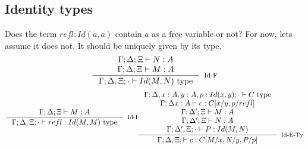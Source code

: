\subsection{Identity types}
Does the term $refl : Id(a,a)$ contain $a$ as a free variable or not? For now, lets assume it does not. It should be uniquely given by its type.
\[
\begin{split}
\inference {\Gamma; \Delta; \Xi \vdash N : A\\
\Gamma;  \Delta; \Xi \vdash M : A\\
}
           {\Gamma; \Delta, \Xi; \cdot \vdash Id(M, N) \text{ type}
           }[Id-F]
\end{split}
\]
\[
\begin{split}
\inference {\Gamma; \Delta; \Xi \vdash M : A\\
}
           {\Gamma; \Delta, \Xi; \cdot \vdash refl : Id(M, M) \text{ type}
           }[Id-I]
\end{split}
\begin{split}
  \inference {\Gamma; \Delta, x : A, y : A, p : Id(x, y); \cdot  \vdash C \text{ type}\\
    \Gamma; \Delta x : A \vdash c : C[x/y, p/refl]\\
    \Gamma; \Delta'; \Xi \vdash M : A\\
    \Gamma; \Delta'; \Xi \vdash N : A\\
    \Gamma; \Delta', \Xi; \cdot \vdash P : Id(M, N)\\
}
           {\Gamma; \Delta, \Xi; \vdash c : C[M/x, N/y, P/p]
           }[Id-E-Ty]
\end{split}
\]\\
